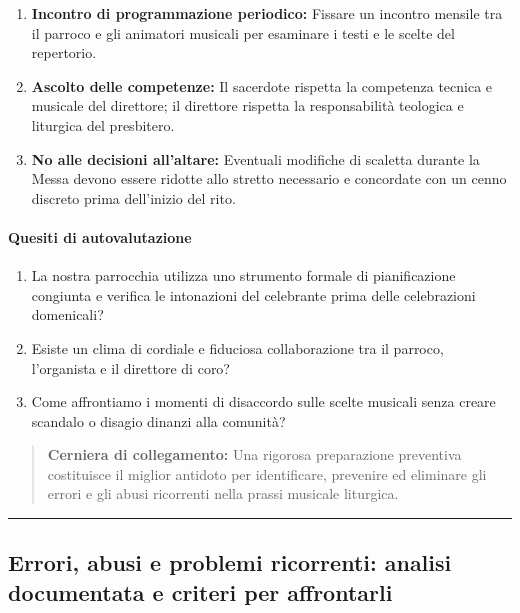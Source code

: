 \documentclass[12pt,a4paper]{article}
\begin{document}
	\begin{enumerate}[label=\arabic*.,leftmargin=*]
		\item \textbf{Incontro di programmazione periodico:} Fissare un incontro mensile tra il parroco e gli animatori musicali per esaminare i testi e le scelte del repertorio.
		\item \textbf{Ascolto delle competenze:} Il sacerdote rispetta la competenza tecnica e musicale del direttore; il direttore rispetta la responsabilità teologica e liturgica del presbitero.
		\item \textbf{No alle decisioni all'altare:} Eventuali modifiche di scaletta durante la Messa devono essere ridotte allo stretto necessario e concordate con un cenno discreto prima dell'inizio del rito.
	\end{enumerate}
	
	\paragraph{Quesiti di autovalutazione}\label{quesiti-di-autovalutazione}
	
	\begin{enumerate}[label=\arabic*.,leftmargin=*]
		\item La nostra parrocchia utilizza uno strumento formale di pianificazione congiunta e verifica le intonazioni del celebrante prima delle celebrazioni domenicali?
		\item Esiste un clima di cordiale e fiduciosa collaborazione tra il parroco, l'organista e il direttore di coro?
		\item Come affrontiamo i momenti di disaccordo sulle scelte musicali senza creare scandalo o disagio dinanzi alla comunità?
	\end{enumerate}
	
	\begin{quote}
		\textbf{Cerniera di collegamento:} Una rigorosa preparazione preventiva costituisce il miglior antidoto per identificare, prevenire ed eliminare gli errori e gli abusi ricorrenti nella prassi musicale liturgica.
	\end{quote}
	
	\begin{center}\rule{0.5\linewidth}{0.5pt}\end{center}
	
	\subsection{Errori, abusi e problemi ricorrenti: analisi documentata e criteri per affrontarli}\label{errori-abusi-e-problemi-ricorrenti-analisi-documentata-e-criteri-per-affrontarli}
	
\end{document}
